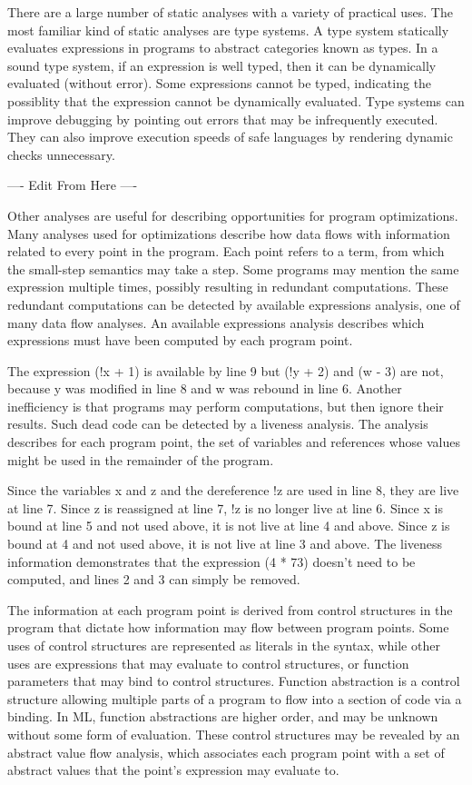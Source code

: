 \documentclass{article}
\begin{document}
There are a large number of static analyses with a variety of practical uses. The most familiar
kind of static analyses are type systems.  A type system statically evaluates expressions
in programs to abstract categories known as types. In a sound type system, if an expression is
well typed, then it can be dynamically evaluated (without error). Some expressions cannot be
typed, indicating the possiblity that the expression cannot be dynamically evaluated. Type
systems can improve debugging by pointing out errors that may be infrequently executed. They
can also improve execution speeds of safe languages by rendering dynamic checks unnecessary.  

---- Edit From Here ----

Other analyses are useful for describing opportunities for program optimizations.  Many
analyses used for optimizations describe how data flows with information related to every point
in the program.  Each point refers to a term, from which the small-step semantics may take a
step.  Some programs may mention the same expression multiple times, possibly resulting in
redundant computations.  These redundant computations can be detected by available expressions
analysis, one of many data flow analyses.  An available expressions analysis describes which
expressions must have been computed by each program point.

The expression (!x + 1) is available by line 9 but (!y + 2) and (w - 3) are not, because y was
modified in line 8 and w was rebound in line 6. Another inefficiency is that programs may
perform computations, but then ignore their results.  Such dead code can be detected by a
liveness analysis.  The analysis describes for each program point, the set of variables and
references whose values might be used in the remainder of the program.

Since the variables x and z and the dereference !z are used in line 8, they are live at line
7.  Since z is reassigned at line 7, !z is no longer live at line 6.  Since x is bound at line
5 and not used above, it is not live at line 4 and above.  Since z is bound at 4 and not used
above, it is not live at line 3 and above. The liveness information demonstrates that the
expression (4 * 73) doesn't need to be computed, and lines 2 and 3 can simply be removed.

The information at each program point is derived from control structures in the program that
dictate how information may flow between program points.  Some uses of control structures are
represented as literals in the syntax, while other uses are expressions that may evaluate to
control structures, or function parameters that may bind to control structures.  Function
abstraction is a control structure allowing multiple parts of a program to flow into a section
of code via a binding.  In ML, function abstractions are higher order, and may be unknown
without some form of evaluation.  These control structures may be revealed by an abstract value
flow analysis, which associates each program point with a set of abstract values that the
point's expression may evaluate to.
\end{document}
